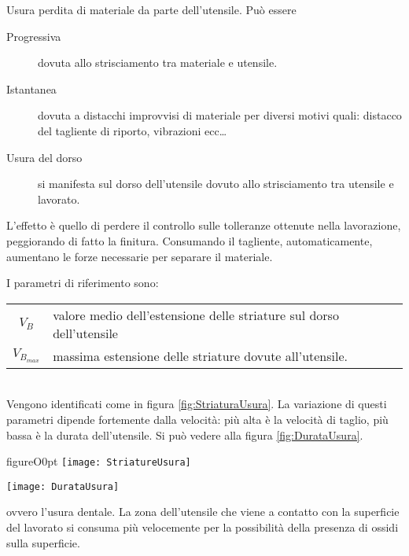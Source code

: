 \begin{definition}{Usura}
perdita di materiale da parte dell'utensile. Può essere
\begin{description}
\item[Progressiva] dovuta allo strisciamento tra materiale e utensile.
\item[Istantanea] dovuta a distacchi improvvisi di materiale per diversi motivi quali: distacco del tagliente di riporto, vibrazioni ecc\dots
\end{description}
\end{definition}

\begin{description}
\item[Usura del dorso] si manifesta sul dorso dell'utensile dovuto allo strisciamento tra utensile e lavorato.
\end{description}
L'effetto è quello di perdere il controllo sulle tolleranze ottenute nella lavorazione, peggiorando di fatto la finitura.
Consumando il tagliente, automaticamente, aumentano le forze necessarie per separare il materiale.

I parametri di riferimento sono:\\
\begin{tabular}{cl}
$V_B$ & valore medio dell'estensione delle striature sul dorso dell'utensile\\
$V_{B_{max}}$ & massima estensione delle striature dovute all'utensile.\\
\end{tabular}\\
Vengono identificati come in figura \ref{fig:StriaturaUsura}.
La variazione di questi parametri dipende fortemente dalla velocità: più alta è la velocità di taglio, più bassa è la durata dell'utensile.
Si può vedere alla figura \ref{fig:DurataUsura}.

\begin{wrapfloat}{figure}{O}{0pt}
\texttt{[image: StriatureUsura]}
\caption{Titpiche striature dovute all'usura}
\label{fig:StriaturaUsura}
\texttt{[image: DurataUsura]}
\caption{Velocità di generazione delle striatura, indice dell'usura dell'utensile. Vale che $v_1 < v_2 < v_3$}
\label{fig:DurataUsura}
\end{wrapfloat}

 ovvero l'usura dentale.
La zona dell'utensile che viene a contatto con la superficie del lavorato si consuma più velocemente per la possibilità della presenza di ossidi sulla superficie.

